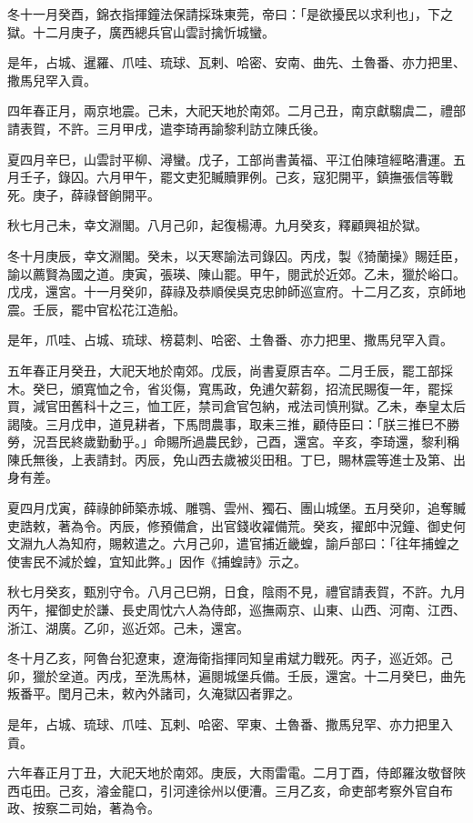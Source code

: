 \begin{pinyinscope}
冬十一月癸酉，錦衣指揮鐘法保請採珠東莞，帝曰：「是欲擾民以求利也」，下之獄。十二月庚子，廣西總兵官山雲討擒忻城蠻。

是年，占城、暹羅、爪哇、琉球、瓦剌、哈密、安南、曲先、土魯番、亦力把里、撒馬兒罕入貢。

四年春正月，兩京地震。己未，大祀天地於南郊。二月己丑，南京獻騶虞二，禮部請表賀，不許。三月甲戌，遣李琦再諭黎利訪立陳氏後。

夏四月辛巳，山雲討平柳、潯蠻。戊子，工部尚書黃福、平江伯陳瑄經略漕運。五月壬子，錄囚。六月甲午，罷文吏犯贓贖罪例。己亥，寇犯開平，鎮撫張信等戰死。庚子，薛祿督餉開平。

秋七月己未，幸文淵閣。八月己卯，起復楊溥。九月癸亥，釋顧興祖於獄。

冬十月庚辰，幸文淵閣。癸未，以天寒諭法司錄囚。丙戌，製《猗蘭操》賜廷臣，諭以薦賢為國之道。庚寅，張瑛、陳山罷。甲午，閱武於近郊。乙未，獵於峪口。戊戌，還宮。十一月癸卯，薛祿及恭順侯吳克忠帥師巡宣府。十二月乙亥，京師地震。壬辰，罷中官松花江造船。

是年，爪哇、占城、琉球、榜葛刺、哈密、土魯番、亦力把里、撒馬兒罕入貢。

五年春正月癸丑，大祀天地於南郊。戊辰，尚書夏原吉卒。二月壬辰，罷工部採木。癸巳，頒寬恤之令，省災傷，寬馬政，免逋欠薪芻，招流民賜復一年，罷採買，減官田舊科十之三，恤工匠，禁司倉官包納，戒法司慎刑獄。乙未，奉皇太后謁陵。三月戊申，道見耕者，下馬問農事，取耒三推，顧侍臣曰：「朕三推巳不勝勞，況吾民終歲勤動乎。」命賜所過農民鈔，己酉，還宮。辛亥，李琦還，黎利稱陳氏無後，上表請封。丙辰，免山西去歲被災田租。丁巳，賜林震等進士及第、出身有差。

夏四月戊寅，薛祿帥師築赤城、雕鶚、雲州、獨石、團山城堡。五月癸卯，追奪贓吏誥敕，著為令。丙辰，修預備倉，出官錢收糴備荒。癸亥，擢郎中況鐘、御史何文淵九人為知府，賜敕遣之。六月己卯，遣官捕近畿蝗，諭戶部曰：「往年捕蝗之使害民不減於蝗，宜知此弊。」因作《捕蝗詩》示之。

秋七月癸亥，甄別守令。八月己巳朔，日食，陰雨不見，禮官請表賀，不許。九月丙午，擢御史於謙、長史周忱六人為侍郎，巡撫兩京、山東、山西、河南、江西、浙江、湖廣。乙卯，巡近郊。己未，還宮。

冬十月乙亥，阿魯台犯遼東，遼海衛指揮同知皇甫斌力戰死。丙子，巡近郊。己卯，獵於坌道。丙戌，至洗馬林，遍閱城堡兵備。壬辰，還宮。十二月癸巳，曲先叛番平。閏月己未，敕內外諸司，久淹獄囚者罪之。

是年，占城、琉球、爪哇、瓦剌、哈密、罕東、土魯番、撒馬兒罕、亦力把里入貢。

六年春正月丁丑，大祀天地於南郊。庚辰，大雨雷電。二月丁酉，侍郎羅汝敬督陜西屯田。己亥，濬金龍口，引河達徐州以便漕。三月乙亥，命吏部考察外官自布政、按察二司始，著為令。


\end{pinyinscope}

